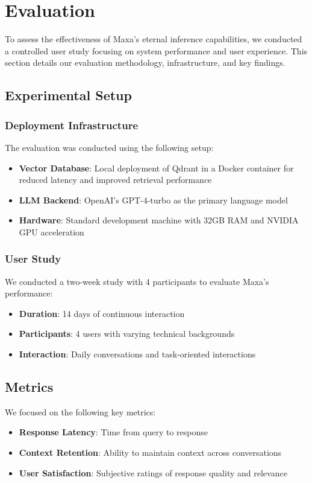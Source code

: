 \section{Evaluation}
\label{sec:evaluation}

To assess the effectiveness of Maxa's eternal inference capabilities, we conducted a controlled user study focusing on system performance and user experience. This section details our evaluation methodology, infrastructure, and key findings.

\subsection{Experimental Setup}

\subsubsection{Deployment Infrastructure}
The evaluation was conducted using the following setup:
\begin{itemize}
    \item \textbf{Vector Database}: Local deployment of Qdrant in a Docker container for reduced latency and improved retrieval performance
    \item \textbf{LLM Backend}: OpenAI's GPT-4-turbo as the primary language model
    \item \textbf{Hardware}: Standard development machine with 32GB RAM and NVIDIA GPU acceleration
\end{itemize}

\subsubsection{User Study}
We conducted a two-week study with 4 participants to evaluate Maxa's performance:
\begin{itemize}
    \item \textbf{Duration}: 14 days of continuous interaction
    \item \textbf{Participants}: 4 users with varying technical backgrounds
    \item \textbf{Interaction}: Daily conversations and task-oriented interactions
\end{itemize}

\subsection{Metrics}
We focused on the following key metrics:
\begin{itemize}
    \item \textbf{Response Latency}: Time from query to response
    \item \textbf{Context Retention}: Ability to maintain context across conversations
    \item \textbf{User Satisfaction}: Subjective ratings of response quality and relevance
\end{itemize}

